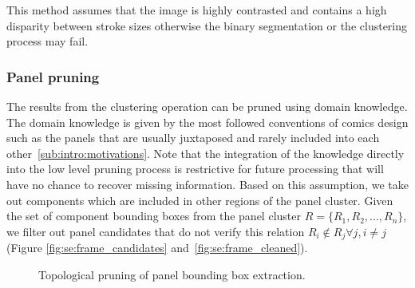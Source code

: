 This method assumes that the image is highly contrasted and contains a high disparity between stroke sizes otherwise the binary segmentation or the clustering process may fail.

\subsubsection{Panel pruning} %
\label{par:se:pruning}

The results from the clustering operation can be pruned using domain knowledge.
The domain knowledge is given by the most followed conventions of comics design such as the panels that are usually juxtaposed and rarely included into each other~\ref{sub:intro:motivations}.
Note that the integration of the knowledge directly into the low level pruning process is restrictive for future processing that will have no chance to recover missing information.
Based on this assumption, we take out components which are included in other regions of the panel cluster.
Given the set of component bounding boxes from the panel cluster $R = \{R_1, R_2, ... , R_n\}$, we filter out panel candidates that do not verify this relation $R_i\notin{R_j} \forall j, i \neq j$ (Figure \ref{fig:se:frame_candidates} and~\ref{fig:se:frame_cleaned}).

	\begin{figure}	%
	  \centering
			\hspace{2em}
		  \caption[Topological pruning of panel bounding box extraction]{Topological pruning of panel bounding box extraction.}
	\end{figure}


